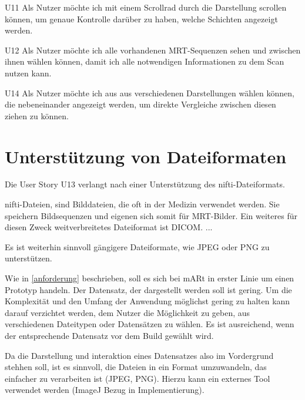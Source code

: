 U11  Als Nutzer möchte ich mit einem Scrollrad durch die Darstellung scrollen können, um genaue Kontrolle darüber zu haben, welche Schichten angezeigt werden.

U12  Als Nutzer möchte ich alle vorhandenen MRT-Sequenzen sehen und zwischen ihnen wählen können, damit ich alle notwendigen Informationen zu dem Scan nutzen kann.  

U14  Als Nutzer möchte ich aus aus verschiedenen Darstellungen wählen können, die nebeneinander angezeigt werden, um direkte Vergleiche zwischen diesen ziehen zu können.


\section{Unterstützung von Dateiformaten} 

Die User Story U13 verlangt nach einer Unterstützung des nifti-Dateiformats.

nifti-Dateien, sind Bilddateien, die oft in der Medizin verwendet werden. Sie speichern Bildsequenzen und eigenen sich somit für MRT-Bilder. 
Ein weiteres für diesen Zweck weitverbreitetes Dateiformat ist DICOM. ...

Es ist weiterhin sinnvoll gängigere Dateiformate, wie JPEG oder PNG zu unterstützen. 

Wie in \ref{anforderung} beschrieben, soll es sich bei mARt in erster Linie um einen Prototyp handeln. 
Der Datensatz, der dargestellt werden soll ist gering. Um die Komplexität und den Umfang der Anwendung möglichst gering zu halten kann darauf verzichtet werden, dem Nutzer die Möglichkeit zu geben, aus verschiedenen Dateitypen oder Datensätzen zu wählen. Es ist ausreichend, wenn der entsprechende Datensatz vor dem Build gewählt wird.

Da die Darstellung und interaktion eines Datensatzes also im Vordergrund stehhen soll, ist es sinnvoll, die Dateien in ein Format umzuwandeln, das einfacher zu verarbeiten ist (JPEG, PNG). Hierzu kann ein externes Tool verwendet werden (ImageJ Bezug in Implementierung).
